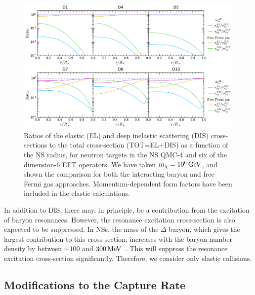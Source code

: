 \begin{figure}[t!bp]
    \centering
    \includegraphics[width=\textwidth]{capture_3/DIS_xsectot_ratio_PeV.pdf}
    \caption[Ratios of the elastic (EL) and deep inelastic scattering (DIS) cross-sections to the total cross-section (TOT=EL+DIS) as a function of the NS radius, for neutron targets in the NS QMC-4 and six of the dimension-6 EFT operators.]{Ratios of the elastic (EL) and deep inelastic scattering (DIS) cross-sections to the total cross-section (TOT=EL+DIS) as a function of the NS radius, for neutron targets in the NS QMC-4 and six of the dimension-6 EFT operators.  We have taken $m_\chi=10^6{\rm \,GeV}$, and shown the comparison for both the interacting baryon and free Fermi gas approaches. Momentum-dependent form factors have been included in the elastic calculations.  }  
    \label{ch5:fig:DISratio}
\end{figure}

In addition to DIS, there may, in principle, be a contribution from the excitation of baryon resonances.  However, the resonance excitation cross-section is also expected to be suppressed. In NSs, the mass of the $\Delta$ baryon, which gives the largest contribution to this cross-section, increases with the baryon number density by between $\sim100$ and $300 {\rm \,MeV}$~\cite{Motta:2019ywl_Deltabaryonsplay}. This will suppress the resonance excitation cross-section significantly. Therefore, we consider only elastic collisions. 


\subsection{Modifications to the Capture Rate}
\label{ch5:subsection:capture_modification}

